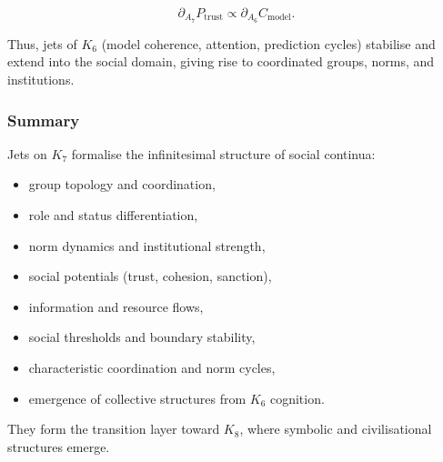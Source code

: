 \[
\partial_{A_7}P_{\mathrm{trust}}
\propto
\partial_{A_6}C_{\mathrm{model}}.
\]

Thus, jets of $K_6$ (model coherence, attention, prediction cycles)
stabilise and extend into the social domain, giving rise to coordinated
groups, norms, and institutions.


\subsubsection{Summary}

Jets on $K_7$ formalise the infinitesimal structure of social continua:

\begin{itemize}
    \item group topology and coordination,
    \item role and status differentiation,
    \item norm dynamics and institutional strength,
    \item social potentials (trust, cohesion, sanction),
    \item information and resource flows,
    \item social thresholds and boundary stability,
    \item characteristic coordination and norm cycles,
    \item emergence of collective structures from $K_6$ cognition.
\end{itemize}

They form the transition layer toward $K_8$, where symbolic and
civilisational structures emerge.
